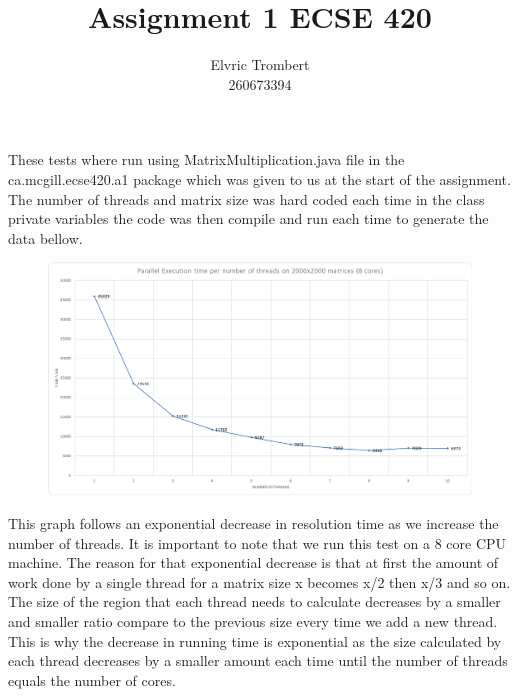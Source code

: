 \documentclass[11pt,letterpaper]{exam}
\author{Elvric Trombert\\260673394}%
\title{Assignment 1 ECSE 420}
\begin{document}
	\maketitle
	\hrulefill
	\begin{questions}
		\question
			These tests where run using MatrixMultiplication.java file in the ca.mcgill.ecse420.a1 package which was given to us at the start of the assignment. The number of threads and matrix size was hard coded each time in the class private variables the code was then compile and run each time to generate the data bellow.
			\begin{figure}[h!]
				\centering
				\includegraphics[scale=0.5]{ExecutionTimeThread}
			\end{figure}
			This graph follows an exponential decrease in resolution time as we increase the number of threads. It is important to note that we run this test on a 8 core CPU machine. The reason for that exponential decrease is that at first the amount of work done by a single thread for a matrix size x becomes x/2 then x/3 and so on. The size of the region that each thread needs to calculate decreases by a smaller and smaller ratio compare to the previous size every time we add a new thread. This is why the decrease in running time is exponential as the size calculated by each thread decreases by a smaller amount each time until the number of threads equals the number of cores.


\end{questions}
\end{document}
